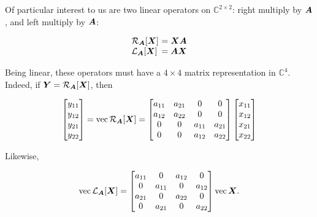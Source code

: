\documentclass[useAMS,usenatbib]{mn2e}
\newcommand{\COMPLEX}{\mathbb{C}}
\newcommand{\mat}[1]{{\bmath{#1}}}
\begin{document}
Of particular interest to us are two linear operators on $\COMPLEX^{2\times2}$: right multiply by $\mat{A}$, and left multiply by $\mat{A}$:

\[
\begin{array}{l@{~}l}
\Rop{\mat{A}}[\mat{X}] &= \mat{XA} \\
\Lop{\mat{A}}[\mat{X}] &= \mat{AX} \\
\end{array}
\]

Being linear, these operators must have a $4\times4$ matrix representation in $\COMPLEX^4$. 
Indeed, if $\mat{Y}=\Rop{\mat{A}}[\mat{X}]$, then 

\begin{equation}
\Matrix{c}{y_{11}\\y_{12}\\y_{21}\\y_{22}} = \VEC{\Rop{\mat{A}}[\mat{X}]} = 
\Matrix{cccc}{a_{11}&a_{21}&0&0 \\ a_{12}&a_{22}&0&0 \\ 0&0&a_{11}&a_{21} \\ 0&0&a_{12}&a_{22} }
\Matrix{c}{x_{11}\\x_{12}\\x_{21}\\x_{22}} 
\end{equation}

Likewise, 

\begin{equation}
\VEC{\Lop{\mat{A}}[\mat{X}]} = 
\Matrix{cccc}{a_{11}&0&a_{12}&0 \\ 0&a_{11}&0&a_{12} \\ a_{21}&0&a_{22}&0  \\ 0&a_{21}&0&a_{22} }
\VEC{\mat{X}}.
\end{equation}




\end{document}
